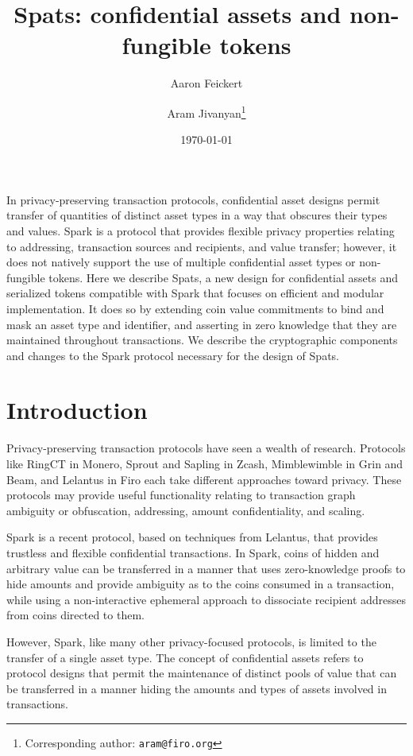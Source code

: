 \documentclass{article}
\title{Spats: confidential assets and non-fungible tokens}
\author[1]{Aaron Feickert}
\author[2,3]{Aram Jivanyan\thanks{Corresponding author: \texttt{aram@firo.org}}}
\affil[1]{Cypher Stack}
\affil[2]{Firo}
\affil[3]{Yerevan State University}
\date{\today}
\begin{document}
\maketitle

In privacy-preserving transaction protocols, confidential asset designs permit transfer of quantities of distinct asset types in a way that obscures their types and values.
Spark is a protocol that provides flexible privacy properties relating to addressing, transaction sources and recipients, and value transfer; however, it does not natively support the use of multiple confidential asset types or non-fungible tokens.
Here we describe Spats, a new design for confidential assets and serialized tokens compatible with Spark that focuses on efficient and modular implementation.
It does so by extending coin value commitments to bind and mask an asset type and identifier, and asserting in zero knowledge that they are maintained throughout transactions.
We describe the cryptographic components and changes to the Spark protocol necessary for the design of Spats.


\section{Introduction}

Privacy-preserving transaction protocols have seen a wealth of research.
Protocols like RingCT \cite{ringct} in Monero, Sprout and Sapling \cite{zcash_sprout, zcash_sapling, zcash} in Zcash, Mimblewimble \cite{mw} in Grin and Beam, and Lelantus \cite{lelantus} in Firo each take different approaches toward privacy.
These protocols may provide useful functionality relating to transaction graph ambiguity or obfuscation, addressing, amount confidentiality, and scaling.

Spark \cite{spark} is a recent protocol, based on techniques from Lelantus, that provides trustless and flexible confidential transactions.
In Spark, coins of hidden and arbitrary value can be transferred in a manner that uses zero-knowledge proofs to hide amounts and provide ambiguity as to the coins consumed in a transaction, while using a non-interactive ephemeral approach to dissociate recipient addresses from coins directed to them.

However, Spark, like many other privacy-focused protocols, is limited to the transfer of a single asset type.
The concept of confidential assets refers to protocol designs that permit the maintenance of distinct pools of value that can be transferred in a manner hiding the amounts and types of assets involved in transactions.
\end{document}
